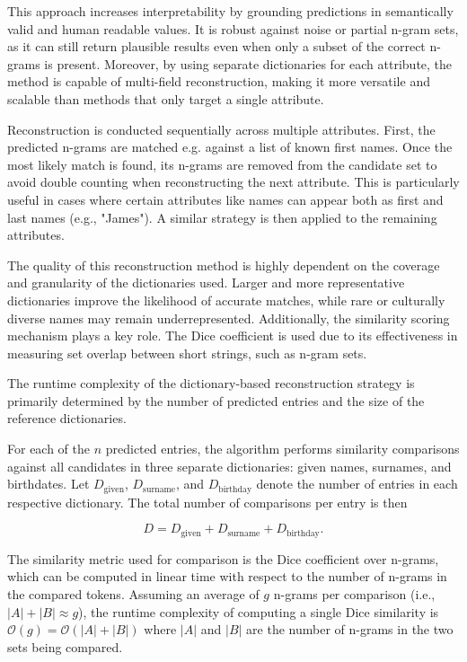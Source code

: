 This approach increases interpretability by grounding predictions in semantically valid and human readable values.
It is robust against noise or partial n-gram sets, as it can still return plausible results even when only a subset of the correct n-grams is present.
Moreover, by using separate dictionaries for each attribute, the method is capable of multi-field reconstruction, making it more versatile and scalable than methods that only target a single attribute.

Reconstruction is conducted sequentially across multiple attributes.
First, the predicted n-grams are matched e.g. against a list of known first names.
Once the most likely match is found, its n-grams are removed from the candidate set to avoid double counting when reconstructing the next attribute.
This is particularly useful in cases where certain attributes like names can appear both as first and last names (e.g., "James").
A similar strategy is then applied to the remaining attributes.

The quality of this reconstruction method is highly dependent on the coverage and granularity of the dictionaries used.
Larger and more representative dictionaries improve the likelihood of accurate matches, while rare or culturally diverse names may remain underrepresented.
Additionally, the similarity scoring mechanism plays a key role.
The Dice coefficient is used due to its effectiveness in measuring set overlap between short strings, such as n-gram sets.

The runtime complexity of the dictionary-based reconstruction strategy is primarily determined by the number of predicted entries and the size of the reference dictionaries.

For each of the \( n \) predicted entries, the algorithm performs similarity comparisons against all candidates in three separate dictionaries: given names, surnames, and birthdates. Let \( D_{\text{given}} \), \( D_{\text{surname}} \), and \( D_{\text{birthday}} \) denote the number of entries in each respective dictionary. The total number of comparisons per entry is then

\[
D = D_{\text{given}} + D_{\text{surname}} + D_{\text{birthday}}.
\]

The similarity metric used for comparison is the Dice coefficient over n-grams, which can be computed in linear time with respect to the number of n-grams in the compared tokens.
Assuming an average of \( g \) n-grams per comparison (i.e., \( |A| + |B| \approx g \)), the runtime complexity of computing a single Dice similarity is \( \mathcal{O}(g) = \mathcal{O}(|A| + |B|) \) where \( |A| \) and \( |B| \) are the number of n-grams in the two sets being compared.


